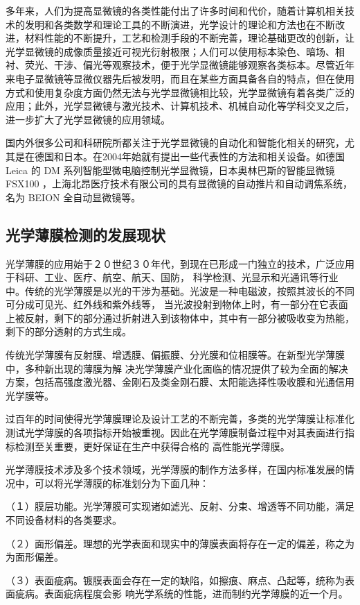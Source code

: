 多年来，人们为提高显微镜的各类性能付出了许多时间和代价，随着计算机相关技术的发明和各类数学和理论工具的不断演进，光学设计的理论和方法也在不断改进，材料性能的不断提升，工艺和检测手段的不断完善，理论基础更改的创新，让光学显微镜的成像质量接近可视光衍射极限；人们可以使用标本染色、暗场、相衬、荧光、干涉、偏光等观察技术，便于光学显微镜能够观察各类标本。尽管近年来电子显微镜等显微仪器先后被发明，而且在某些方面具备各自的特点，但在使用方式和使用复杂度方面仍然无法与光学显微镜相比较，光学显微镜有着各类广泛的应用；此外，光学显微镜与激光技术、计算机技术、机械自动化等学科交叉之后，进一步扩大了光学显微镜的应用领域。

国内外很多公司和科研院所都关注于光学显微镜的自动化和智能化相关的研究，尤其是在德国和日本。在2004年始就有提出一些代表性的方法和相关设备。如德国 Leica 的 DM 系列智能型微电脑控制光学显微镜，日本奥林巴斯的智能显微镜 FSX100 ，上海北昂医疗技术有限公司的具有显微镜的自动推片和自动调焦系统，名为 BEION 全自动显微镜等。

\subsection{光学薄膜检测的发展现状}
光学薄膜的应用始于２０世纪３０年代，到现在已形成一门独立的技术，广泛应用于科研、工业、医疗、航空、航天、国防，
科学检测、光显示和光通讯等行业中\cite{baomo2002}。传统的光学薄膜是以光的干涉为基础。光波是一种电磁波，按照其波长的不同可分成可见光、红外线和紫外线等，
当光波投射到物体上时，有一部分在它表面上被反射，剩下的部分通过折射进入到该物体中，其中有一部分被吸收变为热能，剩下的部分透射的方式生成。

传统光学薄膜有反射膜、增透膜、偏振膜、分光膜和位相膜等。在新型光学薄膜中，多种新出现的薄膜为解
决光学薄膜产业化面临的情况提供了较为全面的解决方案，包括高强度激光器、金刚石及类金刚石膜、太阳能选择性吸收膜和光通信用光学膜等\cite{baomodev2012}。

过百年的时间使得光学薄膜理论及设计工艺的不断完善，多类的光学薄膜让标准化测试光学薄膜的各项指标开始被重视。因此在光学薄膜制备过程中对其表面进行指标检测至关重要，更好保证在生产中获得合格的 高性能光学薄膜。

光学薄膜技术涉及多个技术领域，光学薄膜的制作方法多样，在国内标准发展的情况中，可以将光学薄膜的标准划分为下面几种：

（１）膜层功能。光学薄膜可实现诸如滤光、反射、分束、增透等不同功能，满足不同设备材料的各类要求。

（２）面形偏差。理想的光学表面和现实中的薄膜表面将存在一定的偏差，称之为为面形偏差。

（３）表面疵病。镀膜表面会存在一定的缺陷，如擦痕、麻点、凸起等，统称为表面疵病。表面疵病程度会影
响光学系统的性能，进而制约光学薄膜的近一个月。

